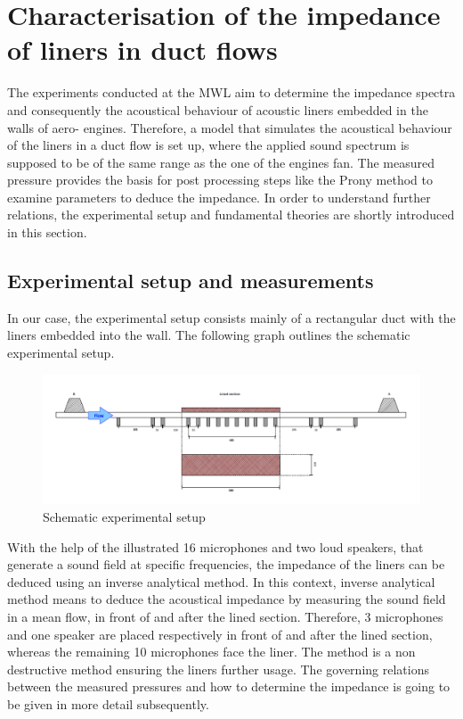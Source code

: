 \documentclass[11pt]{report} %
\begin{document}
\section{Characterisation of the impedance of liners in duct flows}
The experiments conducted at the MWL aim to determine the impedance spectra and consequently the acoustical behaviour of acoustic liners embedded in the walls of aero- engines.
Therefore, a model that simulates the acoustical behaviour of the liners in a duct flow is set up, where the applied sound spectrum is supposed to be of the same range as the one of the engines fan.  
The measured pressure provides the basis for post processing steps like the Prony method to examine parameters to deduce the impedance.
In order to understand further relations, the experimental setup and fundamental theories are shortly introduced in this section. 


\subsection{Experimental setup and measurements}
In our case, the experimental setup consists mainly of a rectangular duct with the liners embedded into the wall.
The following graph outlines the schematic experimental setup.

\begin{figure}[H]
\centering
\includegraphics[scale=0.8]{./Figures/experimental_setup}
\caption{Schematic experimental setup}
\end{figure}

With the help of the illustrated 16 microphones and two loud speakers, that generate a sound field at specific frequencies, the impedance of the liners can be deduced using an inverse analytical method.
In this context, inverse analytical method means to deduce the acoustical impedance by measuring the sound field in a mean flow, in front of and after the lined section.
Therefore, 3 microphones and one speaker are placed respectively in front of and after the lined section, whereas the remaining 10 microphones face the liner.
The method is a non destructive method ensuring the liners further usage.
The governing relations between the measured pressures and how to determine the impedance is going to be given in more detail subsequently.
\end{document}
